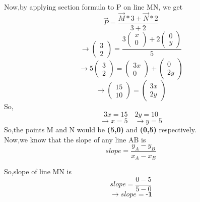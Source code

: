 \documentclass[journal,12pt,threecolumn]{IEEEtran}
\newcommand{\myvec}[1]{\ensuremath{\begin{pmatrix}#1\end{pmatrix}}}
\begin{document}
Now,by applying section formula to P on line MN, we get\\
\begin{equation*}
    \vec{P}=\frac{\vec{M}*3+\vec{N}*2}{3+2}
\end{equation*}
\begin{equation*}
    \rightarrow\myvec{3 \\ 2}=\frac{3\myvec{x\\0}+2\myvec{0\\y}}{5}
\end{equation*}
\begin{equation*}
    \rightarrow5\myvec{3\\2}=\myvec{3x\\0}+\myvec{0\\2y}
\end{equation*}
\begin{equation}
\rightarrow\myvec{15\\10}=\myvec{3x\\2y}  \nonumber
\end{equation}
So,
\begin{equation*}
3x=15\quad 2y=10
\end{equation*}
\begin{equation}
\rightarrow x=5\quad \rightarrow y=5       \nonumber
\end{equation}
So,the points M and N would be \textbf{(5,0)} and \textbf{(0,5)} respectively.\\

Now,we know that the slope of any line AB is
 \begin{equation}
 slope=\frac{y_A-y_B}{x_A-x_B}          \nonumber
\end{equation}

So,slope of line MN is
 \begin{equation*}
 slope=\frac{0-5}{5-0}
 \end{equation*}
  \begin{equation}
  \rightarrow slope=\textbf{-1}   \nonumber
  \end{equation}
  
\end{document}
